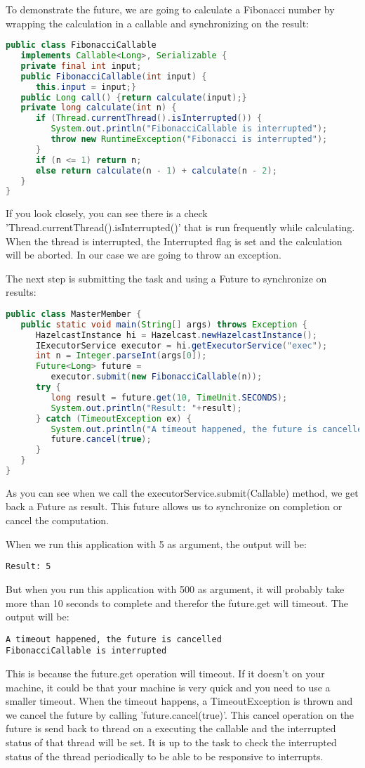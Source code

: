 To demonstrate the future, we are going to calculate a Fibonacci number by wrapping the calculation in a callable and synchronizing on the result:
\begin{lstlisting}[language=java]
public class FibonacciCallable 
   implements Callable<Long>, Serializable {
   private final int input;
   public FibonacciCallable(int input) {
      this.input = input;}
   public Long call() {return calculate(input);}
   private long calculate(int n) {
      if (Thread.currentThread().isInterrupted()) {
         System.out.println("FibonacciCallable is interrupted");
         throw new RuntimeException("Fibonacci is interrupted");
      }
      if (n <= 1) return n;
      else return calculate(n - 1) + calculate(n - 2);
   }
}
\end{lstlisting}
If you look closely, you can see there is a check 'Thread.currentThread().isInterrupted()' that is run frequently while calculating. When the thread is interrupted, the Interrupted flag is set and the calculation will be aborted. In our case we are going to throw an exception.

The next step is submitting the task and using a Future to synchronize on results:
\begin{lstlisting}[language=java]
public class MasterMember {
   public static void main(String[] args) throws Exception {
      HazelcastInstance hi = Hazelcast.newHazelcastInstance();
      IExecutorService executor = hi.getExecutorService("exec");
      int n = Integer.parseInt(args[0]);
      Future<Long> future = 
         executor.submit(new FibonacciCallable(n));
      try {
         long result = future.get(10, TimeUnit.SECONDS);
         System.out.println("Result: "+result);
      } catch (TimeoutException ex) {
         System.out.println("A timeout happened, the future is cancelled");
         future.cancel(true);
      }
   }
}
\end{lstlisting}
As you can see when we call the executorService.submit(Callable) method, we get back a Future as result. This future allows us to synchronize on completion or cancel the computation. 

When we run this application with 5 as argument, the output will be: 
\begin{lstlisting}
Result: 5
\end{lstlisting}
But when you run this application with 500 as argument, it will probably take more than 10 seconds to complete and therefor the future.get will timeout. The output will be:
\begin{lstlisting}
A timeout happened, the future is cancelled
FibonacciCallable is interrupted
\end{lstlisting}
This is because the future.get operation will timeout. If it doesn't on your machine, it could be that your machine is very quick and you need to use a smaller timeout. When the timeout happens, a TimeoutException is thrown and we cancel the future by calling 'future.cancel(true)'. This cancel operation on the future is send back to thread on a executing the callable and the interrupted status of that thread will be set. It is up to the task to check the interrupted status of the thread periodically to be able to be responsive to interrupts.


